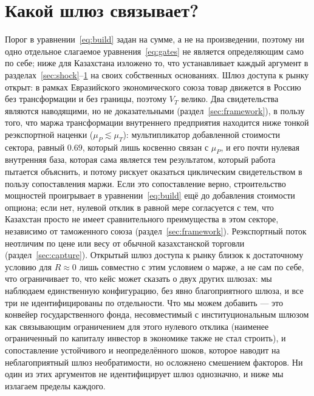 \documentclass[12pt]{article}
\begin{document}
\section{Какой шлюз связывает?}\label{sec:why}

Порог в уравнении~\eqref{eq:build} задан на сумме, а не на произведении, поэтому ни одно
отдельное слагаемое уравнения~\eqref{eq:gates} не является определяющим само по себе; ниже
для Казахстана изложено то, что устанавливает каждый аргумент в
разделах~\ref{sec:shock}--\ref{sec:why} на своих собственных основаниях. Шлюз доступа к
рынку открыт: в рамках Евразийского экономического союза товар движется в Россию без
трансформации и без границы, поэтому $V_T$ велико. Два свидетельства являются наводящими, но
не доказательными (раздел~\ref{sec:framework}), в пользу того, что маржа трансформации
внутреннего предприятия находится ниже тонкой реэкспортной наценки ($\mu_P \lesssim \mu_T$):
мультипликатор добавленной стоимости сектора, равный $0.69$, который лишь косвенно связан с
$\mu_P$, и его почти нулевая внутренняя база, которая сама является тем результатом, который
работа пытается объяснить, и потому рискует оказаться циклическим свидетельством в пользу
сопоставления маржи. Если это сопоставление верно, строительство мощностей проигрывает в
уравнении~\eqref{eq:build} ещё до добавления стоимости опциона; если нет, нулевой отклик в
равной мере согласуется с тем, что Казахстан просто не имеет сравнительного преимущества в
этом секторе, независимо от таможенного союза (раздел~\ref{sec:framework}). Реэкспортный
поток неотличим по цене или весу от обычной казахстанской торговли
(раздел~\ref{sec:capture}). Открытый шлюз доступа к рынку близок к достаточному условию для
$R \approx 0$ лишь совместно с этим условием о марже, а не сам по себе, что ограничивает то,
что кейс может сказать о двух других шлюзах: мы наблюдаем единственную конфигурацию, без
явно благоприятного шлюза, и все три не идентифицированы по отдельности. Что мы можем
добавить — это конвейер государственного фонда, несовместимый с институциональным шлюзом как
связывающим ограничением для этого нулевого отклика (наименее ограниченный по капиталу
инвестор в экономике также не стал строить), и сопоставление устойчивого и неопределённого
шоков, которое наводит на неблагоприятный шлюз необратимости, но осложнено смешением
факторов. Ни один из этих аргументов не идентифицирует шлюз однозначно, и ниже мы излагаем
пределы каждого.
\end{document}
